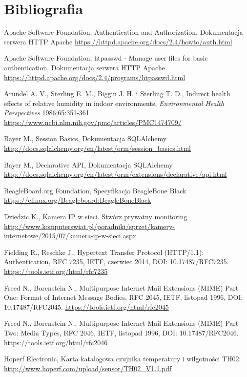 \documentclass[a4paper,12pt,twoside]{article}
\begin{document}
\section{Bibliografia}
\begin{thebibliography}{9}

Apache Software Foundation, Authentication and Authorization, Dokumentacja serwera HTTP Apache
\url{https://httpd.apache.org/docs/2.4/howto/auth.html}

Apache Software Foundation, htpasswd - Manage user files for basic authentication, Dokumentacja serwera HTTP Apache
\url{https://httpd.apache.org/docs/2.4/programs/htpasswd.html}

Arundel A. V., Sterling E. M., Biggin J. H. i Sterling T. D., Indirect health effects of relative humidity in indoor environments, \textit{Environmental Health Perspectives} 1986;65:351-361
\url{https://www.ncbi.nlm.nih.gov/pmc/articles/PMC1474709/}

Bayer M., Session Basics, Dokumentacja SQLAlchemy
\url{http://docs.sqlalchemy.org/en/latest/orm/session_basics.html}

Bayer M., Declarative API, Dokumentacja SQLAlchemy
\url{http://docs.sqlalchemy.org/en/latest/orm/extensions/declarative/api.html}

BeagleBoard.org Foundation, Specyfikacja BeagleBone Black
\url{https://elinux.org/Beagleboard:BeagleBoneBlack}

Dziedzic K., Kamera IP w sieci. Stwórz prywatny monitoring
\url{http://www.komputerswiat.pl/poradniki/sprzet/kamery-internetowe/2015/07/kamera-ip-w-sieci.aspx}

Fielding R., Reschke J., Hypertext Transfer Protocol (HTTP/1.1): Authentication, RFC 7235, IETF, czerwiec 2014, DOI: 10.17487/RFC7235.
\url{https://tools.ietf.org/html/rfc7235}

Freed N., Borenstein N., Multipurpose Internet Mail Extensions (MIME) Part One: Format of Internet Message Bodies, RFC 2045, IETF, listopad 1996, DOI: 10.17487/RFC2045.
\url{https://tools.ietf.org/html/rfc2045}

Freed N., Borenstein N., Multipurpose Internet Mail Extensions (MIME) Part Two: Media Types, RFC 2046, IETF, listopad 1996, DOI: 10.17487/RFC2046.
\url{https://tools.ietf.org/html/rfc2046}

Hoperf Electronic, Karta katalogowa czujnika temperatury i wilgotności TH02:
\url{http://www.hoperf.com/upload/sensor/TH02_V1.1.pdf}


\end{thebibliography}
\end{document}
